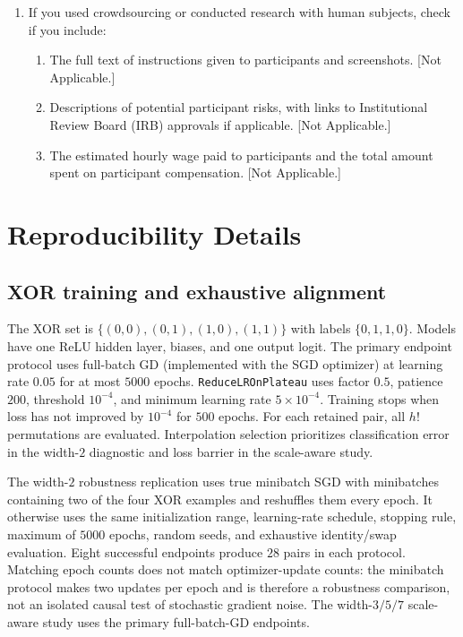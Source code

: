 \documentclass[twoside]{article}
\begin{document}
\begin{enumerate}
  \item If you used crowdsourcing or conducted research with human subjects,
  check if you include:
  \begin{enumerate}
    \item The full text of instructions given to participants and screenshots.
    [Not Applicable.]
    \item Descriptions of potential participant risks, with links to
    Institutional Review Board (IRB) approvals if applicable. [Not Applicable.]
    \item The estimated hourly wage paid to participants and the total amount
    spent on participant compensation. [Not Applicable.]
  \end{enumerate}
\end{enumerate}

\clearpage
\appendix
\onecolumn
\setcounter{figure}{0}
\renewcommand{\thefigure}{A.\arabic{figure}}
\renewcommand{\theHfigure}{appendix.\arabic{figure}}

\section{Reproducibility Details}
\label{app:details}

\subsection{XOR training and exhaustive alignment}

The XOR set is $\{(0,0),(0,1),(1,0),(1,1)\}$ with labels
$\{0,1,1,0\}$.  Models have one ReLU hidden layer, biases, and one output logit.
The primary endpoint protocol uses full-batch GD (implemented with the SGD
optimizer) at learning rate $0.05$ for at most $5000$ epochs.
\texttt{ReduceLROnPlateau} uses factor $0.5$, patience $200$, threshold
$10^{-4}$, and minimum learning rate $5\times10^{-4}$.  Training stops when
loss has not improved by $10^{-4}$ for $500$ epochs.  For each retained pair,
all $h!$ permutations are evaluated.  Interpolation selection prioritizes
classification error in the width-$2$ diagnostic and loss barrier in the
scale-aware study.

The width-$2$ robustness replication uses true minibatch SGD with minibatches
containing two of the four XOR examples and reshuffles them every epoch.  It otherwise uses the
same initialization range, learning-rate schedule, stopping rule, maximum of
$5000$ epochs, random seeds, and exhaustive identity/swap evaluation.  Eight
successful endpoints produce $28$ pairs in each protocol.  Matching epoch
counts does not match optimizer-update counts: the minibatch protocol makes two
updates per epoch and is therefore a robustness comparison, not an isolated
causal test of stochastic gradient noise.  The width-$3/5/7$ scale-aware study
uses the primary full-batch-GD endpoints.
\end{document}
